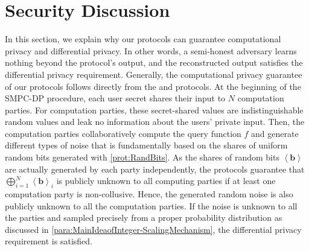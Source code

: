       \section{Security Discussion}
      \label{SecurityDiscussion}

      In this section, we explain why our \smpc protocols can guarantee computational privacy and differential privacy. In other words, a semi-honest adversary learns nothing beyond the protocol's output, and the reconstructed output satisfies the differential privacy requirement. Generally, the computational privacy guarantee of our \smpc protocols follows directly from the \booleanGMW and \arithmeticGMW protocols. At the beginning of the SMPC-DP procedure, each user secret shares their input to $ N$ computation parties. For computation parties, these secret-shared values are indistinguishable random values and leak no information about the users' private input. 
      Then, the computation parties collaboratively compute the query function $f$ and generate different types of noise that is fundamentally based on the shares of uniform random bits generated with \autoref{prot:RandBits}. As the shares of random bits $\left\langle \boldsymbol{b}\right\rangle$ are actually generated by each party independently, the \booleanGMW protocols guarantee that $\bigoplus _{i=1}^{N}\left\langle \boldsymbol{b}\right\rangle_i $ is publicly unknown to all computing parties if at least one computation party is non-collusive. Hence, the generated random noise is also publicly unknown to all the computation parties. If the noise is unknown to all the parties and sampled precisely from a proper probability distribution as discussed in \autoref{para:MainIdeaofInteger-ScalingMechanism}, the differential privacy requirement is satisfied. 




